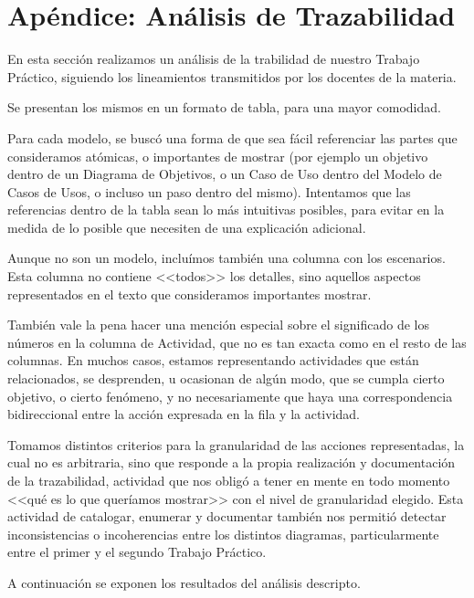 \section{Apéndice: Análisis de Trazabilidad}

En esta sección realizamos un análisis de la trabilidad de nuestro Trabajo
Práctico, siguiendo los lineamientos transmitidos por los docentes de la
materia.

Se presentan los mismos en un formato de tabla, para una mayor comodidad.

Para cada modelo, se buscó una forma de que sea fácil referenciar las partes
que consideramos atómicas, o importantes de mostrar (por ejemplo un objetivo
dentro de un Diagrama de Objetivos, o un Caso de Uso dentro del Modelo de
Casos de Usos, o incluso un paso dentro del mismo). Intentamos que las
referencias dentro de la tabla sean lo más intuitivas posibles, para evitar en
la medida de lo posible que necesiten de una explicación adicional.

Aunque no son un modelo, incluímos también una columna con los escenarios.
Esta columna no contiene <<todos>> los detalles, sino aquellos aspectos
representados en el texto que consideramos importantes mostrar.

También vale la pena hacer una mención especial sobre el significado de los
números en la columna de Actividad, que no es tan exacta como en el resto de
las columnas. En muchos casos, estamos representando actividades que están
relacionados, se desprenden, u ocasionan de algún modo, que se cumpla cierto
objetivo, o cierto fenómeno, y no necesariamente que haya una correspondencia
bidireccional entre la acción expresada en la fila y la actividad.

Tomamos distintos criterios para la granularidad de las acciones
representadas, la cual no es arbitraria, sino que responde a la propia
realización y documentación de la trazabilidad, actividad que nos obligó a
tener en mente en todo momento <<qué es lo que queríamos mostrar>> con el
nivel de granularidad elegido. Esta actividad de catalogar, enumerar y
documentar también nos permitió detectar inconsistencias o incoherencias entre
los distintos diagramas, particularmente entre el primer y el segundo
Trabajo Práctico.

A continuación se exponen los resultados del análisis descripto.

